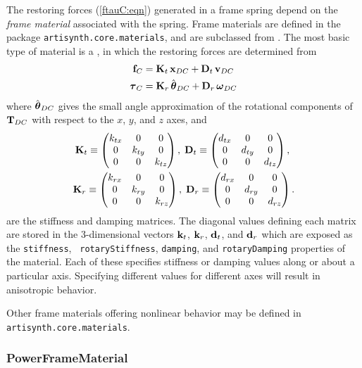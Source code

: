 The restoring forces (\ref{ftauC:eqn}) generated in a frame spring
depend on the {\it frame material} associated with the spring. Frame
materials are defined in the package {\tt artisynth.core.materials},
and are subclassed from
.
The most basic type of material is a 
,
in which the restoring forces are determined from
%
\begin{align*}
{\bf f}_C & = 
{\bf K}_{t} \, {\bf x}_{DC} + {\bf D}_{t} \, {\bf v}_{DC} \\
\boldsymbol\tau_C & = 
{\bf K}_{r} \, \hat{\boldsymbol\theta}_{DC} + {\bf D}_{r} \, \boldsymbol\omega_{DC}
\label{flinear:eqn}
\end{align*}
%
where $\hat{\boldsymbol\theta}_{DC}$ gives the small angle approximation of the
rotational components of ${\bf T}_{DC}$ with respect to the $x$, $y$, and
$z$ axes, and
%
\begin{gather*}
{\bf K}_{t} \equiv 
\left(\begin{matrix} k_{tx} & 0 & 0 \\ 0 & k_{ty} & 0 \\ 0 & 0 & k_{tz} \end{matrix}\right), \;
{\bf D}_{t} \equiv 
\left(\begin{matrix} d_{tx} & 0 & 0 \\ 0 & d_{ty} & 0 \\ 0 & 0 & d_{tz} \end{matrix}\right), \;\\
{\bf K}_{r} \equiv
\left(\begin{matrix} k_{r x} & 0 & 0 \\ 0 & k_{r y} & 0 \\ 0 & 0 & k_{r z} \end{matrix}\right), \;
{\bf D}_{r} \equiv
\left(\begin{matrix} d_{r x} & 0 & 0 \\ 0 & d_{r y} & 0 \\ 0 & 0 & d_{r z} \end{matrix}\right).
\end{gather*}
%
are the stiffness and damping matrices. The diagonal values defining
each matrix are stored in the 3-dimensional vectors ${\bf k}_t$, ${\bf k}_r$,
${\bf d}_t$, and ${\bf d}_r$ which are exposed as the {\tt stiffness}, {\tt
rotaryStiffness}, {\tt damping}, and {\tt rotaryDamping} properties of
the material. Each of these specifies stiffness or damping values
along or about a particular axis. Specifying different values for
different axes will result in anisotropic behavior.

Other frame materials offering nonlinear behavior may be defined in
{\tt artisynth.core.materials}.

\subsubsection{PowerFrameMaterial}

